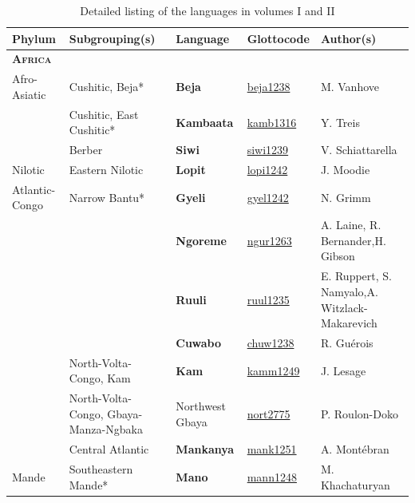 \documentclass[output=paper,colorlinks,citecolor=brown]{langscibook}
\begin{document}
\begin{table}
    \centering\footnotesize
    \caption{Detailed listing of the languages in volumes I and II}
    \label{tab:intro:list-of-languages0102}
    \begin{tabularx}{\textwidth}{llp{30mm}lQ}
    \lsptoprule
         Phylum & Subgrouping(s) & \bfseries Language & Glottocode & Author(s)\\
    \midrule
         \textsc{\textbf{Africa}} & & & &\\    
         Afro-Asiatic& Cushitic, Beja* & \bfseries Beja & \href{https://glottolog.org/resource/languoid/id/beja1238}{beja1238}& M. Vanhove\\
         & Cushitic, East Cushitic* & \bfseries Kambaata & \href{https://glottolog.org/resource/languoid/id/kamb1316}{kamb1316} & Y. Treis\\
         & Berber & \bfseries Siwi & \href{https://glottolog.org/resource/languoid/id/siwi1239}{siwi1239} & V. Schiattarella\\
         Nilotic & Eastern Nilotic & \bfseries Lopit & \href{https://glottolog.org/resource/languoid/id/lopi1242}{lopi1242} & J. Moodie\\
         Atlantic-Congo  & Narrow Bantu* & \bfseries Gyeli & \href{https://glottolog.org/resource/languoid/id/gyel1242}{gyel1242} & N. Grimm\\
         &  & \bfseries Ngoreme & \href{https://glottolog.org/resource/languoid/id/ngur1263}{ngur1263} & A. Laine,  R. Bernander,\newline H. Gibson\\
         & & \bfseries Ruuli & \href{https://glottolog.org/resource/languoid/id/ruul1235}{ruul1235} & E. Ruppert, S. Namyalo,\newline A. Witzlack-Makarevich\\
         & & \bfseries Cuwabo & \href{https://glottolog.org/resource/languoid/id/chuw1238}{chuw1238} & R. Guérois\\
         & North-Volta-Congo, Kam & \bfseries Kam & \href{https://glottolog.org/resource/languoid/id/kamm1249}{kamm1249} & J. Lesage\\
         & North-Volta-Congo, Gbaya-Manza-Ngbaka & Northwest Gbaya & \href{https://glottolog.org/resource/languoid/id/nort2775}{nort2775} & P. Roulon-Doko\\
         & Central Atlantic & \bfseries Mankanya & \href{https://glottolog.org/resource/languoid/id/mank1251}{mank1251} & A. Montébran\\
         Mande &  Southeastern Mande* & \bfseries Mano & \href{https://glottolog.org/resource/languoid/id/mann1248}{mann1248} & M. Khachaturyan\\

\end{tabularx}
\end{table}
\end{document}
